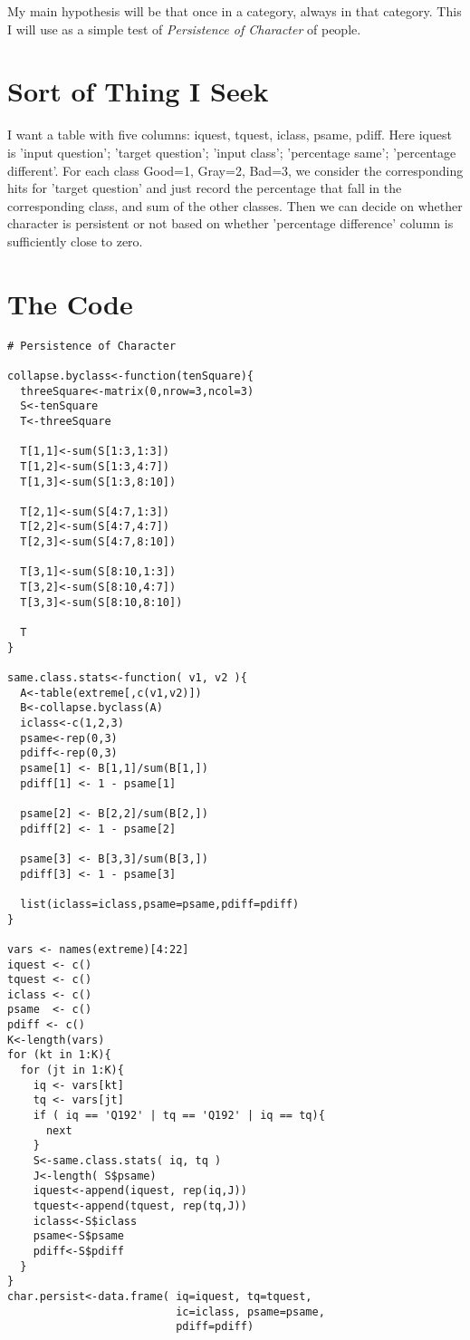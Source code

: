 \documentclass{amsart}
\begin{document}
My main hypothesis will be that once in a category, always in that category.  This I will use as a simple test of {\em Persistence of Character} of people.

\section{Sort of Thing I Seek}

I want a table with five columns: iquest, tquest, iclass, psame, pdiff.  Here iquest is 'input question'; 'target question'; 'input class'; 'percentage same'; 'percentage different'.  For each class Good=1, Gray=2, Bad=3, we consider the corresponding hits for 'target question' and just record the percentage that fall in the corresponding class, and sum of the other classes.  Then we can decide on whether character is persistent or not based on whether 'percentage difference' column is sufficiently close to zero.

\section{The Code}

\begin{verbatim}
# Persistence of Character

collapse.byclass<-function(tenSquare){
  threeSquare<-matrix(0,nrow=3,ncol=3)
  S<-tenSquare
  T<-threeSquare
  
  T[1,1]<-sum(S[1:3,1:3])
  T[1,2]<-sum(S[1:3,4:7])
  T[1,3]<-sum(S[1:3,8:10])

  T[2,1]<-sum(S[4:7,1:3])
  T[2,2]<-sum(S[4:7,4:7])
  T[2,3]<-sum(S[4:7,8:10])
  
  T[3,1]<-sum(S[8:10,1:3])
  T[3,2]<-sum(S[8:10,4:7])
  T[3,3]<-sum(S[8:10,8:10])
  
  T
}

same.class.stats<-function( v1, v2 ){
  A<-table(extreme[,c(v1,v2)])
  B<-collapse.byclass(A)
  iclass<-c(1,2,3)
  psame<-rep(0,3)
  pdiff<-rep(0,3)
  psame[1] <- B[1,1]/sum(B[1,])
  pdiff[1] <- 1 - psame[1]

  psame[2] <- B[2,2]/sum(B[2,])
  pdiff[2] <- 1 - psame[2]

  psame[3] <- B[3,3]/sum(B[3,])
  pdiff[3] <- 1 - psame[3]
  
  list(iclass=iclass,psame=psame,pdiff=pdiff)
}

vars <- names(extreme)[4:22]
iquest <- c()
tquest <- c()
iclass <- c()
psame  <- c()
pdiff <- c()
K<-length(vars)
for (kt in 1:K){
  for (jt in 1:K){
    iq <- vars[kt]
    tq <- vars[jt]
    if ( iq == 'Q192' | tq == 'Q192' | iq == tq){
      next
    }
    S<-same.class.stats( iq, tq )
    J<-length( S$psame)
    iquest<-append(iquest, rep(iq,J))
    tquest<-append(tquest, rep(tq,J))
    iclass<-S$iclass
    psame<-S$psame
    pdiff<-S$pdiff
  }
}
char.persist<-data.frame( iq=iquest, tq=tquest, 
                          ic=iclass, psame=psame, 
                          pdiff=pdiff)
                          \end{verbatim}
\end{document}
